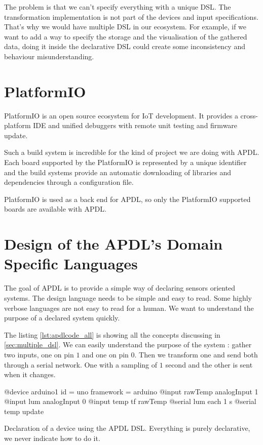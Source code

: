 The problem is that we can’t specify everything with a unique \gls{DSL}. The
transformation implementation is not part of the devices and input
specifications. That’s why we would have multiple \gls{DSL} in our ecosystem.
For example, if we want to add a way to specify the storage and the
visualisation of the gathered data, doing it inside the declarative \gls{DSL}
could create some inconsistency and behaviour misunderstanding.

\section{PlatformIO}
\label{sec:platformio}

PlatformIO\cite{Ivan2017} is an open source ecosystem for IoT development. It
provides a cross-platform IDE and unified debuggers with remote unit testing and
firmware update\cite{Ivan2017}.

Such a build system is incredible for the kind of project we are doing with
\gls{APDL}. Each board supported by the PlatformIO is represented by a unique
identifier and the build systems provide an automatic downloading of libraries
and dependencies through a configuration file.

PlatformIO is used as a back end for \gls{APDL}, so only the PlatformIO
supported boards are available with \gls{APDL}.

\section{Design of the APDL’s Domain Specific Languages}
\label{sec:design_apdl_dsls}

The goal of \gls{APDL} is to provide a simple way of declaring sensors oriented
systems. The design language needs to be simple and easy to read. Some highly
verbose languages are not easy to read for a human. We want to understand the
purpose of a declared system quickly.

The listing \ref{lst:apdlcode_all} is showing all the concepts discussing in
\ref{sec:multiple_dsl}. We can easily understand the purpose of the system :
gather two inputs, one on pin $1$ and one on pin $0$. Then we transform one and
send both through a serial network. One with a sampling of $1$ second and the
other is sent when it changes.

\begin{listing}[H]
  \centering
\begin{apdlcode}
@device arduino1 {
    id = uno
    framework = arduino
    @input rawTemp analogInput 1
    @input lum analogInput 0
    @input temp tf rawTemp
    @serial lum each 1 s
    @serial temp update
}
\end{apdlcode}
  \caption[Declaration of a device with the \gls{APDL} \gls{DSL}]{Declaration of
  a device using the \gls{APDL} \gls{DSL}. Everything is purely declarative, we
  never indicate how to do it.}
  \label{lst:apdlcode_all}
\end{listing}

